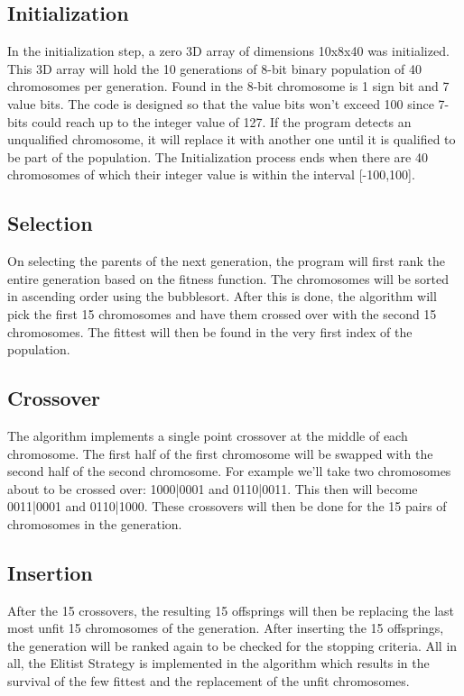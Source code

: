 \documentclass{acm_proc_article-sp}
\begin{document}
\subsection{Initialization}
In the initialization step, a zero 3D array of dimensions 10x8x40 was initialized. This 3D array will hold the 10 generations of 8-bit binary population of 40 chromosomes per generation. Found in the 8-bit chromosome is 1 sign bit and 7 value bits. The code is designed so that the value bits won't exceed 100 since 7-bits could reach up to the integer value of 127. If the program detects an unqualified chromosome, it will replace it with another one until it is qualified to be part of the population. The Initialization process ends when there are 40 chromosomes of which their integer value is within the interval [-100,100].

\subsection{Selection}
On selecting the parents of the next generation, the program will first rank the entire generation based on the fitness function. The chromosomes will be sorted in ascending order using the bubblesort. After this is done, the algorithm will pick the first 15 chromosomes and have them crossed over with the second 15 chromosomes. The fittest will then be found in the very first index of the population.

\subsection{Crossover}
The algorithm implements a single point crossover at the middle of each chromosome. The first half of the first chromosome will be swapped with the second half of the second chromosome. For example we'll take two chromosomes about to be crossed over: 1000|0001 and 0110|0011. This then will become 0011|0001 and 0110|1000. These crossovers will then be done for the 15 pairs of chromosomes in the generation.

\subsection{Insertion}
After the 15 crossovers, the resulting 15 offsprings will then be replacing the last most unfit 15 chromosomes of the generation. After inserting the 15 offsprings, the generation will be ranked again to be checked for the stopping criteria. All in all, the Elitist Strategy is implemented in the algorithm which results in the survival of the few fittest and the replacement of the unfit chromosomes.
\end{document}
